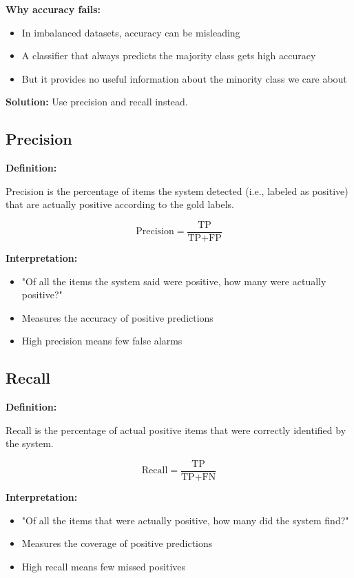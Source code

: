 \documentclass[11pt,a4paper]{article}
\theoremstyle{definition}
\theoremstyle{plain}
\theoremstyle{remark}
\begin{document}
\textbf{Why accuracy fails:}
\begin{itemize}
    \item In imbalanced datasets, accuracy can be misleading
    \item A classifier that always predicts the majority class gets high accuracy
    \item But it provides no useful information about the minority class we care about
\end{itemize}

\textbf{Solution:} Use precision and recall instead.

\subsection{Precision}

\textbf{Definition:}

Precision is the percentage of items the system detected (i.e., labeled as positive) that are actually positive according to the gold labels.

\[
\text{Precision} = \frac{\text{TP}}{\text{TP} + \text{FP}}
\]

\textbf{Interpretation:}
\begin{itemize}
    \item "Of all the items the system said were positive, how many were actually positive?"
    \item Measures the accuracy of positive predictions
    \item High precision means few false alarms
\end{itemize}

\subsection{Recall}

\textbf{Definition:}

Recall is the percentage of actual positive items that were correctly identified by the system.

\[
\text{Recall} = \frac{\text{TP}}{\text{TP} + \text{FN}}
\]

\textbf{Interpretation:}
\begin{itemize}
    \item "Of all the items that were actually positive, how many did the system find?"
    \item Measures the coverage of positive predictions
    \item High recall means few missed positives
\end{itemize}
\end{document}
